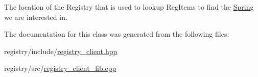 The location of the Registry that is used to lookup Reg\+Items to find the \hyperlink{classSpring}{Spring} we are interested in. 

The documentation for this class was generated from the following files\+:\begin{DoxyCompactItemize}
\item 
registry/include/\hyperlink{registry__client_8hpp}{registry\+\_\+client.\+hpp}\item 
registry/src/\hyperlink{registry__client__lib_8cpp}{registry\+\_\+client\+\_\+lib.\+cpp}\end{DoxyCompactItemize}
